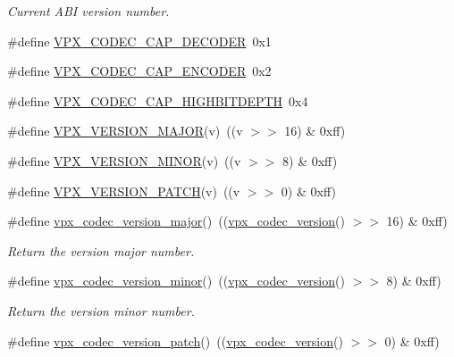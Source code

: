 \begin{DoxyCompactItemize}
\begin{DoxyCompactList}\small\item\em Current A\+BI version number. \end{DoxyCompactList}\item 
\#define \hyperlink{group__codec_gae10ad7f9548170aef77df09d48ad108a}{V\+P\+X\+\_\+\+C\+O\+D\+E\+C\+\_\+\+C\+A\+P\+\_\+\+D\+E\+C\+O\+D\+ER}~0x1
\item 
\#define \hyperlink{group__codec_gab2e8b76fff95ebd573a17bdc11f8a441}{V\+P\+X\+\_\+\+C\+O\+D\+E\+C\+\_\+\+C\+A\+P\+\_\+\+E\+N\+C\+O\+D\+ER}~0x2
\item 
\#define \hyperlink{group__codec_ga8edce93a29457f2de6c0f92e3b3c192d}{V\+P\+X\+\_\+\+C\+O\+D\+E\+C\+\_\+\+C\+A\+P\+\_\+\+H\+I\+G\+H\+B\+I\+T\+D\+E\+P\+TH}~0x4
\item 
\#define \hyperlink{group__codec_gadebddd67347fe47c0772b1e06b6173ba}{V\+P\+X\+\_\+\+V\+E\+R\+S\+I\+O\+N\+\_\+\+M\+A\+J\+OR}(v)~((v $>$$>$ 16) \& 0xff)
\item 
\#define \hyperlink{group__codec_ga4a5ce4588576306dee0d95e8f8706f86}{V\+P\+X\+\_\+\+V\+E\+R\+S\+I\+O\+N\+\_\+\+M\+I\+N\+OR}(v)~((v $>$$>$ 8) \& 0xff)
\item 
\#define \hyperlink{group__codec_ga4acf2cf4c35ff123d17cd67c069fdbaa}{V\+P\+X\+\_\+\+V\+E\+R\+S\+I\+O\+N\+\_\+\+P\+A\+T\+CH}(v)~((v $>$$>$ 0) \& 0xff)
\item 
\#define \hyperlink{group__codec_gaf314b746e4e202045e85ac073c29a495}{vpx\+\_\+codec\+\_\+version\+\_\+major}()~((\hyperlink{group__codec_ga163037ae037ac760da65e4130c7d4767}{vpx\+\_\+codec\+\_\+version}() $>$$>$ 16) \& 0xff)\hypertarget{group__codec_gaf314b746e4e202045e85ac073c29a495}{}\label{group__codec_gaf314b746e4e202045e85ac073c29a495}

\begin{DoxyCompactList}\small\item\em Return the version major number. \end{DoxyCompactList}\item 
\#define \hyperlink{group__codec_ga2b668688a7d1551ea89bcda8f2587f93}{vpx\+\_\+codec\+\_\+version\+\_\+minor}()~((\hyperlink{group__codec_ga163037ae037ac760da65e4130c7d4767}{vpx\+\_\+codec\+\_\+version}() $>$$>$ 8) \& 0xff)\hypertarget{group__codec_ga2b668688a7d1551ea89bcda8f2587f93}{}\label{group__codec_ga2b668688a7d1551ea89bcda8f2587f93}

\begin{DoxyCompactList}\small\item\em Return the version minor number. \end{DoxyCompactList}\item 
\#define \hyperlink{group__codec_ga8ed64bded0d763fa2158312ac8fbcf26}{vpx\+\_\+codec\+\_\+version\+\_\+patch}()~((\hyperlink{group__codec_ga163037ae037ac760da65e4130c7d4767}{vpx\+\_\+codec\+\_\+version}() $>$$>$ 0) \& 0xff)\hypertarget{group__codec_ga8ed64bded0d763fa2158312ac8fbcf26}{}\label{group__codec_ga8ed64bded0d763fa2158312ac8fbcf26}


\end{DoxyCompactItemize}
